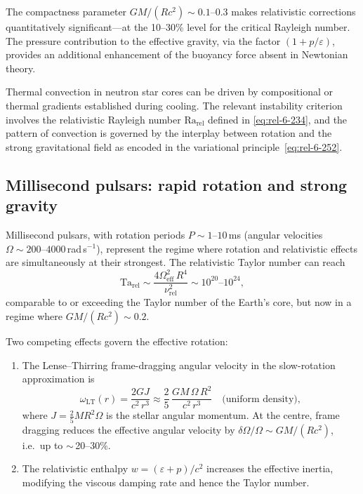 The compactness parameter $GM/(Rc^{2}) \sim 0.1$--$0.3$ makes
relativistic corrections quantitatively significant---at the
10--30\% level for the critical Rayleigh number.  The pressure
contribution to the effective gravity, via the factor
$(1 + p/\varepsilon)$, provides an additional enhancement of the
buoyancy force absent in Newtonian theory.

Thermal convection in neutron star cores can be driven by
compositional or thermal gradients established during cooling.
The relevant instability criterion involves the relativistic
Rayleigh number $\mathrm{Ra}_{\mathrm{rel}}$ defined in
\eqref{eq:rel-6-234}, and the pattern of convection is governed
by the interplay between rotation and the strong gravitational
field as encoded in the variational
principle~\eqref{eq:rel-6-252}.

\subsection{Millisecond pulsars: rapid rotation and strong
  gravity}\label{sec:rel-63b}

Millisecond pulsars, with rotation periods $P \sim 1$--$10$\,ms
(angular velocities $\Omega \sim 200$--$4000$\,rad\,s$^{-1}$),
represent the regime where rotation and relativistic effects are
simultaneously at their strongest.  The relativistic Taylor number
can reach
\begin{equation}\label{eq:rel-6-Ta-msp}
  \mathrm{Ta}_{\mathrm{rel}}
  \sim \frac{4\Omega_{\mathrm{eff}}^{2}\,R^{4}}
            {\nu_{\mathrm{rel}}^{2}}
  \sim 10^{20}\text{--}10^{24},
\end{equation}
comparable to or exceeding the Taylor number of the Earth's core,
but now in a regime where $GM/(Rc^{2}) \sim 0.2$.

Two competing effects govern the effective rotation:
\begin{enumerate}
\item The Lense--Thirring frame-dragging angular velocity in the
  slow-rotation approximation is
  \begin{equation}\label{eq:rel-6-LT}
    \omega_{\mathrm{LT}}(r)
    = \frac{2GJ}{c^{2}\,r^{3}}
    \approx \frac{2}{5}\,\frac{GM\,\Omega\,R^{2}}{c^{2}\,r^{3}}
    \quad\text{(uniform density)},
  \end{equation}
  where $J = \tfrac{2}{5}MR^{2}\Omega$ is the stellar angular
  momentum.  At the centre, frame dragging reduces the effective
  angular velocity by $\delta\Omega/\Omega \sim GM/(Rc^{2})$,
  i.e.\ up to $\sim$\,20--30\%.
\item The relativistic enthalpy $w = (\varepsilon + p)/c^{2}$
  increases the effective inertia, modifying the viscous damping
  rate and hence the Taylor number.
\end{enumerate}

